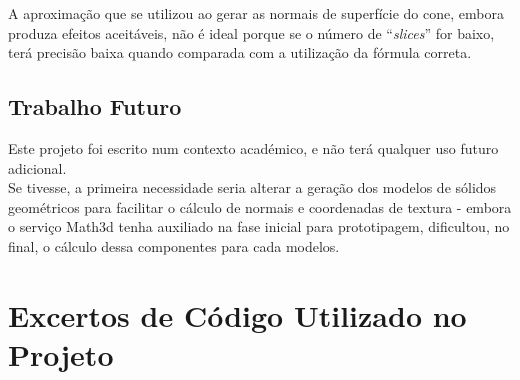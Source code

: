\documentclass[11pt,a4paper]{report}%
\begin{document}
A aproximação que se utilizou ao gerar as normais de superfície do cone, embora
produza efeitos aceitáveis, não é ideal porque se o número de ``\textit{slices}'' for baixo,
terá precisão baixa quando comparada com a utilização da fórmula correta.

\section{Trabalho Futuro}

Este projeto foi escrito num contexto académico, e não terá qualquer uso futuro adicional.\\

Se tivesse, a primeira necessidade seria alterar a geração dos modelos de sólidos geométricos
para facilitar o cálculo de normais e coordenadas de textura - embora o serviço Math3d tenha
auxiliado na fase inicial para prototipagem, dificultou, no final, o cálculo dessa componentes
para cada modelos.

\appendix %
\chapter{Excertos de Código Utilizado no Projeto}

\end{document}
